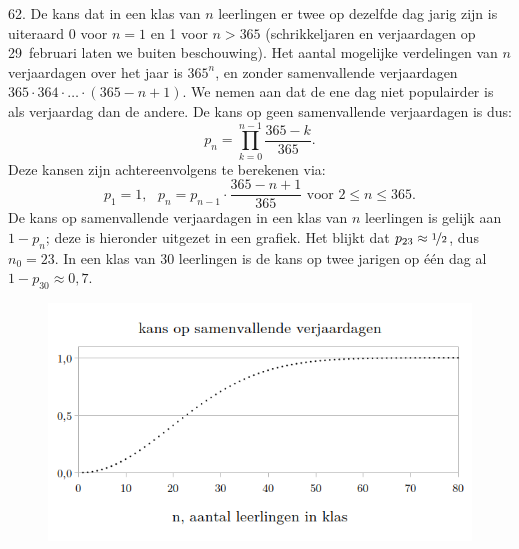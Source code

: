 \clearpage

\begin{problem}{62.}
    De kans dat in een klas van $n$ leerlingen er twee op dezelfde dag jarig zijn is uiteraard 0 voor $n = 1$ en 1 voor $n > 365$ (schrikkeljaren en verjaardagen op 29~februari laten we buiten beschouwing). Het aantal mogelijke verdelingen van $n$ verjaardagen over het jaar is ${365}^n$, en zonder samenvallende verjaardagen $365 \cdot 364 \cdot \dots \cdot (365 - n + 1)$. We nemen aan dat de ene dag niet populairder is als verjaardag dan de andere. De kans op geen samenvallende verjaardagen is dus:
    \begin{equation*}
        p_n = \textstyle\prod\limits_{k=0}^{n-1} \frac{365 - k}{365}.
    \end{equation*}
    Deze kansen zijn achtereenvolgens te berekenen via:
    \begin{equation*}
        p_1 = 1, \text{ } p_n = p_{n-1} \cdot \frac{365 - n + 1}{365} \text{ voor } 2 \leq n \leq 365.
    \end{equation*}
    De kans op samenvallende verjaardagen in een klas van $n$ leerlingen is gelijk aan $1 - p_n$; deze is hieronder uitgezet in een grafiek. Het blijkt dat $p_{23} \approx \nicefrac{1}{2}$, dus $n_0 = 23$. In een klas van 30 leerlingen is de kans op twee jarigen op één dag al $1 - p_{30} \approx 0{,}7$.
    \begin{figure}
        \includegraphics[scale=0.35]{resources/oplossing62}
    \end{figure}
\end{problem}

\clearpage

